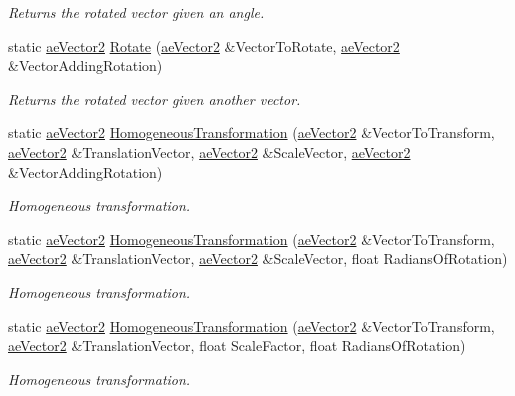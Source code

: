 \begin{DoxyCompactItemize}
\begin{DoxyCompactList}\small\item\em Returns the rotated vector given an angle. \end{DoxyCompactList}\item 
static \hyperlink{structae_core_1_1ae_vector2}{ae\+Vector2} \hyperlink{structae_core_1_1ae_matrix2_a00ac01f6801c84661e859a2115645122}{Rotate} (\hyperlink{structae_core_1_1ae_vector2}{ae\+Vector2} \&Vector\+To\+Rotate, \hyperlink{structae_core_1_1ae_vector2}{ae\+Vector2} \&Vector\+Adding\+Rotation)
\begin{DoxyCompactList}\small\item\em Returns the rotated vector given another vector. \end{DoxyCompactList}\item 
static \hyperlink{structae_core_1_1ae_vector2}{ae\+Vector2} \hyperlink{structae_core_1_1ae_matrix2_a3f2cbb0c29b87b04e1c421932b8c0127}{Homogeneous\+Transformation} (\hyperlink{structae_core_1_1ae_vector2}{ae\+Vector2} \&Vector\+To\+Transform, \hyperlink{structae_core_1_1ae_vector2}{ae\+Vector2} \&Translation\+Vector, \hyperlink{structae_core_1_1ae_vector2}{ae\+Vector2} \&Scale\+Vector, \hyperlink{structae_core_1_1ae_vector2}{ae\+Vector2} \&Vector\+Adding\+Rotation)
\begin{DoxyCompactList}\small\item\em Homogeneous transformation. \end{DoxyCompactList}\item 
static \hyperlink{structae_core_1_1ae_vector2}{ae\+Vector2} \hyperlink{structae_core_1_1ae_matrix2_a60802ab5a75638359d1c482a1a14d460}{Homogeneous\+Transformation} (\hyperlink{structae_core_1_1ae_vector2}{ae\+Vector2} \&Vector\+To\+Transform, \hyperlink{structae_core_1_1ae_vector2}{ae\+Vector2} \&Translation\+Vector, \hyperlink{structae_core_1_1ae_vector2}{ae\+Vector2} \&Scale\+Vector, float Radians\+Of\+Rotation)
\begin{DoxyCompactList}\small\item\em Homogeneous transformation. \end{DoxyCompactList}\item 
static \hyperlink{structae_core_1_1ae_vector2}{ae\+Vector2} \hyperlink{structae_core_1_1ae_matrix2_a9f0399f9481315d8e1e096b8b8ed6b85}{Homogeneous\+Transformation} (\hyperlink{structae_core_1_1ae_vector2}{ae\+Vector2} \&Vector\+To\+Transform, \hyperlink{structae_core_1_1ae_vector2}{ae\+Vector2} \&Translation\+Vector, float Scale\+Factor, float Radians\+Of\+Rotation)
\begin{DoxyCompactList}\small\item\em Homogeneous transformation. \end{DoxyCompactList}\end{DoxyCompactItemize}
